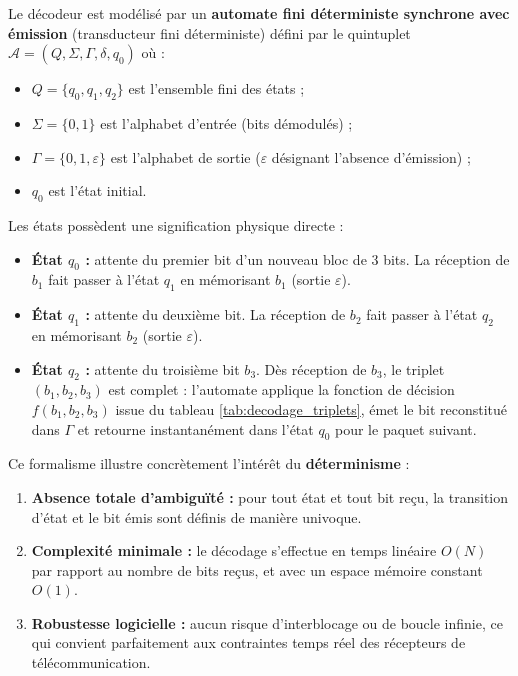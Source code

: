 \documentclass[a4paper,12pt]{report}
\begin{document}
Le décodeur est modélisé par un \textbf{automate fini déterministe synchrone avec émission} (transducteur fini déterministe) défini par le quintuplet $\mathcal{A} = (Q, \Sigma, \Gamma, \delta, q_0)$ où :
\begin{itemize}
    \item $Q = \{q_0, q_1, q_2\}$ est l'ensemble fini des états ;
    \item $\Sigma = \{0, 1\}$ est l'alphabet d'entrée (bits démodulés) ;
    \item $\Gamma = \{0, 1, \varepsilon\}$ est l'alphabet de sortie ($\varepsilon$ désignant l'absence d'émission) ;
    \item $q_0$ est l'état initial.
\end{itemize}

Les états possèdent une signification physique directe :
\begin{itemize}
    \item \textbf{État $q_0$ :} attente du premier bit d'un nouveau bloc de 3 bits. La réception de $b_1$ fait passer à l'état $q_1$ en mémorisant $b_1$ (sortie $\varepsilon$).
    \item \textbf{État $q_1$ :} attente du deuxième bit. La réception de $b_2$ fait passer à l'état $q_2$ en mémorisant $b_2$ (sortie $\varepsilon$).
    \item \textbf{État $q_2$ :} attente du troisième bit $b_3$. Dès réception de $b_3$, le triplet $(b_1, b_2, b_3)$ est complet : l'automate applique la fonction de décision $f(b_1, b_2, b_3)$ issue du tableau \ref{tab:decodage_triplets}, émet le bit reconstitué dans $\Gamma$ et retourne instantanément dans l'état $q_0$ pour le paquet suivant.
\end{itemize}

Ce formalisme illustre concrètement l'intérêt du \textbf{déterminisme} :
\begin{enumerate}
    \item \textbf{Absence totale d'ambiguïté :} pour tout état et tout bit reçu, la transition d'état et le bit émis sont définis de manière univoque.
    \item \textbf{Complexité minimale :} le décodage s'effectue en temps linéaire $O(N)$ par rapport au nombre de bits reçus, et avec un espace mémoire constant $O(1)$.
    \item \textbf{Robustesse logicielle :} aucun risque d'interblocage ou de boucle infinie, ce qui convient parfaitement aux contraintes temps réel des récepteurs de télécommunication.
\end{enumerate}
\end{document}
